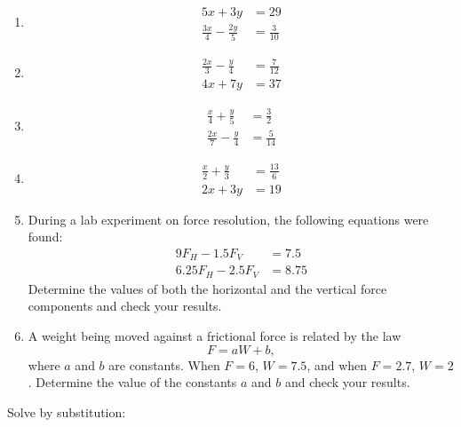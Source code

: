 \documentclass[
  12pt,
  oneside]{book}
\theoremstyle{definition}
\theoremstyle{definition}
\theoremstyle{definition}
\theoremstyle{definition}
\theoremstyle{remark}
\begin{document}
\begin{enumerate}
\def\labelenumi{\arabic{enumi}.}
\setcounter{enumi}{2}
\item
  \begin{align*}
  5x+3y &= 29\\
  \frac{3x}{4}-\frac{2y}{5} &= \frac{3}{10}
  \end{align*}
\item
  \begin{align*}
  \frac{2x}{3}-\frac{y}{4} &= \frac{7}{12}\\
  4x+7y &= 37
  \end{align*}
\item
  \begin{align*}
  \frac{x}{4}+\frac{y}{5} &= \frac{3}{2}\\
  \frac{2x}{7}-\frac{y}{4} &= \frac{5}{14}
  \end{align*}
\item
  \begin{align*}
  \frac{x}{2}+\frac{y}{3} &= \frac{13}{6}\\
  2x+3y &= 19
  \end{align*}
\item
  During a lab experiment on force resolution, the following equations were found:
  \begin{align*}
  9F_H - 1.5F_V &= 7.5\\
  6.25 F_H - 2.5 F_V &= 8.75
  \end{align*}
  Determine the values of both the horizontal and the vertical force components and check your results.
\item
  A weight being moved against a frictional force is related by the law
  \[F=aW+b,\]
  where \(a\) and \(b\) are constants. When \(F=6\), \(W=7.5\), and when
  \(F=2.7\), \(W=2\). Determine the value of the constants \(a\) and \(b\) and check
  your results.
\end{enumerate}

Solve by substitution:
\end{document}
